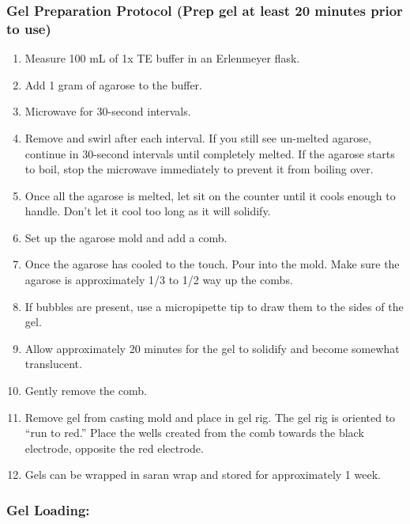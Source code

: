 \documentclass[
  letterpaper,
  DIV=11,
  numbers=noendperiod]{scrreprt}
\providecommand{\tightlist}{%
  \setlength{\itemsep}{0pt}\setlength{\parskip}{0pt}}
\begin{document}
\subsubsection*{Gel Preparation Protocol (Prep gel at least 20 minutes
prior to
use)}\label{gel-preparation-protocol-prep-gel-at-least-20-minutes-prior-to-use}

\begin{enumerate}
\def\labelenumi{\arabic{enumi}.}
\tightlist
\item
  Measure 100 mL of 1x TE buffer in an Erlenmeyer flask.
\item
  Add 1 gram of agarose to the buffer.
\item
  Microwave for 30-second intervals.
\item
  Remove and swirl after each interval. If you still see un-melted
  agarose, continue in 30-second intervals until completely melted. If
  the agarose starts to boil, stop the microwave immediately to prevent
  it from boiling over.
\item
  Once all the agarose is melted, let sit on the counter until it cools
  enough to handle. Don't let it cool too long as it will solidify.
\item
  Set up the agarose mold and add a comb.
\item
  Once the agarose has cooled to the touch. Pour into the mold. Make
  sure the agarose is approximately 1/3 to 1/2 way up the combs.
\item
  If bubbles are present, use a micropipette tip to draw them to the
  sides of the gel.
\item
  Allow approximately 20 minutes for the gel to solidify and become
  somewhat translucent.
\item
  Gently remove the comb.
\item
  Remove gel from casting mold and place in gel rig. The gel rig is
  oriented to ``run to red.'' Place the wells created from the comb
  towards the black electrode, opposite the red electrode.
\item
  Gels can be wrapped in saran wrap and stored for approximately 1 week.
\end{enumerate}

\subsubsection*{Gel Loading:}\label{gel-loading}
\end{document}
